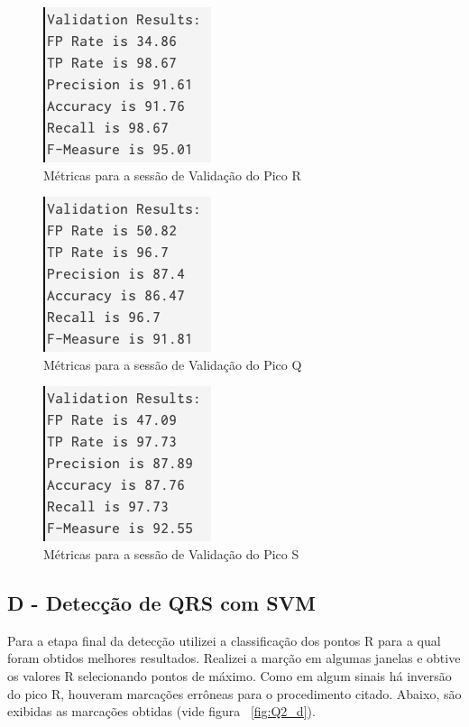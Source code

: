 \documentclass{article}
\begin{document}
\begin{figure}[H]
	\begin{center}
		\includegraphics[scale=0.7]{../SVM_metrics.png}
		\caption{Métricas para a sessão de Validação do Pico R}
		\label{fig:SVM_metrics}
	\end{center}
\end{figure}  

\begin{figure}[H]
	\begin{center}
		\includegraphics[scale=0.7]{../SVM_q_metrics.png}
		\caption{Métricas para a sessão de Validação do Pico Q}
		\label{fig:SVM_q_metrics}
	\end{center}
\end{figure}  

\begin{figure}[H]
	\begin{center}
		\includegraphics[scale=0.7]{../SVM_s_metrics.png}
		\caption{Métricas para a sessão de Validação do Pico S}
		\label{fig:SVM_s_metrics}
	\end{center}
\end{figure}  
\newpage
\subsection*{D - Detecção de QRS com SVM}
Para a etapa final da detecção utilizei a classificação dos pontos R para a qual foram obtidos melhores resultados. Realizei a marção em algumas janelas e obtive os valores R selecionando pontos de máximo. Como em algum sinais há inversão do pico R, houveram marcações errôneas para o procedimento citado. Abaixo, são exibidas as marcações obtidas (vide figura ~\ref{fig:Q2_d}).
\end{document}
